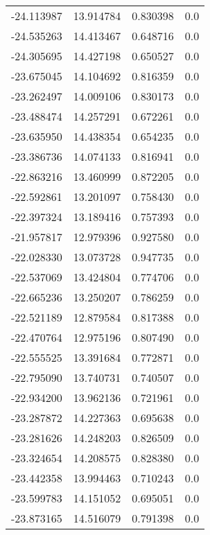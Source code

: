 \begin{tabular}{rrrr}
      -24.113987 &        13.914784 &    0.830398 &   0.0 \\
      -24.535263 &        14.413467 &    0.648716 &   0.0 \\
      -24.305695 &        14.427198 &    0.650527 &   0.0 \\
      -23.675045 &        14.104692 &    0.816359 &   0.0 \\
      -23.262497 &        14.009106 &    0.830173 &   0.0 \\
      -23.488474 &        14.257291 &    0.672261 &   0.0 \\
      -23.635950 &        14.438354 &    0.654235 &   0.0 \\
      -23.386736 &        14.074133 &    0.816941 &   0.0 \\
      -22.863216 &        13.460999 &    0.872205 &   0.0 \\
      -22.592861 &        13.201097 &    0.758430 &   0.0 \\
      -22.397324 &        13.189416 &    0.757393 &   0.0 \\
      -21.957817 &        12.979396 &    0.927580 &   0.0 \\
      -22.028330 &        13.073728 &    0.947735 &   0.0 \\
      -22.537069 &        13.424804 &    0.774706 &   0.0 \\
      -22.665236 &        13.250207 &    0.786259 &   0.0 \\
      -22.521189 &        12.879584 &    0.817388 &   0.0 \\
      -22.470764 &        12.975196 &    0.807490 &   0.0 \\
      -22.555525 &        13.391684 &    0.772871 &   0.0 \\
      -22.795090 &        13.740731 &    0.740507 &   0.0 \\
      -22.934200 &        13.962136 &    0.721961 &   0.0 \\
      -23.287872 &        14.227363 &    0.695638 &   0.0 \\
      -23.281626 &        14.248203 &    0.826509 &   0.0 \\
      -23.324654 &        14.208575 &    0.828380 &   0.0 \\
      -23.442358 &        13.994463 &    0.710243 &   0.0 \\
      -23.599783 &        14.151052 &    0.695051 &   0.0 \\
      -23.873165 &        14.516079 &    0.791398 &   0.0 \\

\end{tabular}
